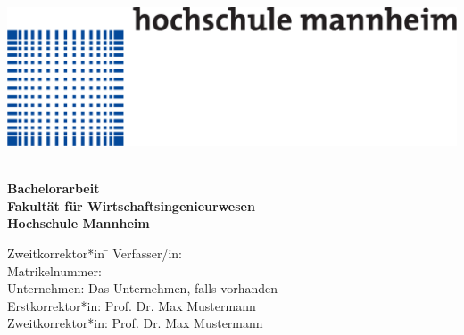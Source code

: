 \begin{titlepage}
\begin{minipage}{\textwidth}
		\vspace{-2cm}
		\noindent \includegraphics[scale=0.3]{img/logo.pdf}
\end{minipage}
\vspace{3em}

\begin{center}
	{\textbf{\Large{}\TheThesisTitle}}\\[5em]
	{\textbf{\large{}Bachelorarbeit}}\\[2em]
	{\textbf{Fakultät für Wirtschaftsingenieurwesen}\\[.5em] \textbf{Hochschule Mannheim}}
	
	\vspace{3em}
\vfill

\begin{minipage}{\textwidth}

\begin{tabbing}
	Zweitkorrektor*in \hspace{0.85cm}\=\kill
	Verfasser/in: \> \TheThesisAuthor \\[1.5mm]
	Matrikelnummer:  \\[1.5mm]
	Unternehmen: \> Das Unternehmen, falls vorhanden  \\[1.5mm]
	Erstkorrektor*in: \> Prof. Dr. Max Mustermann \\[1.5mm]
	Zweitkorrektor*in: \> Prof. Dr. Max Mustermann \\[1.5mm]

\end{tabbing}
\end{minipage}

\end{center}

\end{titlepage}